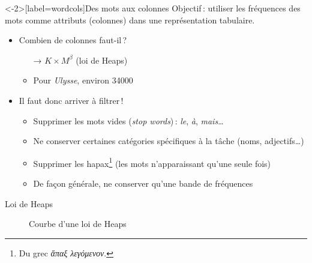 \documentclass[../allslides.tex]{subfiles}
\begin{document}
\begin{frame}<-2>[label=wordcols]{Des mots aux colonnes}
	Objectif : utiliser les \alert{fréquences} des mots comme attributs (colonnes) dans une représentation tabulaire.
	\pause
	\begin{itemize}
		\item<1-> Combien de colonnes faut-il ?
			\pause
				\begin{itemize}
					\item[→] \(K×M^β\) (loi de Heaps)
					\item Pour \emph{Ulysse}, environ \num{34000}
				\end{itemize}
		\item<3-> Il faut donc arriver à filtrer !
			\begin{itemize}
				\item<4-> Supprimer les \alert{mots vides} (\emph{stop words}) : \emph{le}, \emph{à}, \emph{mais}…
				\item<5-> Ne conserver certaines catégories spécifiques à la tâche (noms, adjectifs…)
				\item<6-> Supprimer les \alert{hapax}\footnote{Du grec \textit{ἅπαξ λεγόμενον}.} (les mots n'apparaissant qu'une seule fois)
				\item<7->[→] De façon générale, ne conserver qu'une \alert{bande de fréquences}
			\end{itemize}
	\end{itemize}
	\mbox{}  %
\end{frame}

\begin{frame}[label=heapslawgraph]{Loi de Heaps}
	\begin{figure}
		\tikzset{external/export=true}
		\caption{Courbe d'une loi de Heaps}
	\end{figure}
\end{frame}
\end{document}
